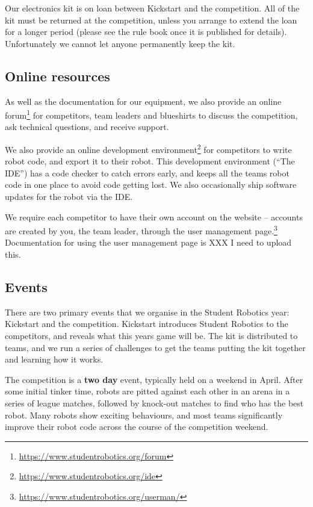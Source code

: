 \documentclass[a4paper]{article}
\begin{document}
Our electronics kit is on loan between Kickstart and the competition. All of the
kit must be returned at the competition, unless you arrange to extend the loan
for a longer period (please see the rule book once it is published for details).
Unfortunately we cannot let anyone permanently keep the kit.

\subsection*{Online resources}

As well as the documentation for our equipment, we also provide an online
forum\footnote{\url{https://www.studentrobotics.org/forum}} for competitors,
team leaders and blueshirts to discuss the competition, ask technical questions,
and receive support.

We also provide an online development
environment\footnote{\url{https://www.studentrobotics.org/ide}} for competitors
to write robot code, and export it to their robot. This development environment
(``The IDE'') has a code checker to catch errors early, and keeps all the
teams robot code in one place to avoid code getting lost. We also occasionally
ship software updates for the robot via the IDE.

We require each competitor to have their
own account on the website -- accounts are created by you, the team leader,
through the user management
page.\footnote{\url{https://www.studentrobotics.org/userman/}} Documentation
for using the user management page is XXX I need to upload this.

\subsection*{Events}

There are two primary events that we organise in the Student Robotics year:
Kickstart and the competition.
Kickstart introduces Student Robotics to the competitors, and reveals what this
years game will be. The kit is distributed to teams, and we run a series of
challenges to get the teams putting the kit together and learning how it works.

The competition is a \textbf{two day} event, typically held on a weekend in
April. After some initial tinker time, robots are pitted against each other in
an arena in a series of league matches, followed by knock-out matches to find
who has the best robot. Many robots show exciting behaviours, and most teams
significantly improve their robot code across the course of the competition
weekend.
\end{document}
